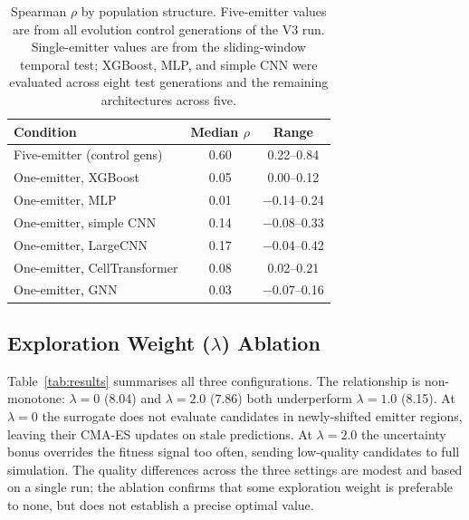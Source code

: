 \documentclass[conference]{IEEEtran}
\begin{document}
\begin{table}[htbp]
  \caption{Spearman $\rho$ by population structure. Five-emitter values
           are from all evolution control generations of the V3 run.
           Single-emitter values are from the sliding-window temporal
           test; XGBoost, MLP, and simple CNN were evaluated across
           eight test generations and the remaining architectures across
           five.}
  \label{tab:rho_comparison}
  \begin{center}
    \begin{tabular}{lcc}
      \toprule
      \textbf{Condition} & \textbf{Median $\rho$} & \textbf{Range} \\
      \midrule
      Five-emitter (control gens) & 0.60 & 0.22--0.84 \\
      One-emitter, XGBoost        & 0.05 & 0.00--0.12 \\
      One-emitter, MLP            & 0.01 & $-$0.14--0.24 \\
      One-emitter, simple CNN     & 0.14 & $-$0.08--0.33 \\
      One-emitter, LargeCNN       & 0.17 & $-$0.04--0.42 \\
      One-emitter, CellTransformer & 0.08 & 0.02--0.21 \\
      One-emitter, GNN            & 0.03 & $-$0.07--0.16 \\
      \bottomrule
    \end{tabular}
  \end{center}
\end{table}

\subsection{Exploration Weight ($\lambda$) Ablation}

Table~\ref{tab:results} summarises all three configurations. The relationship
is non-monotone: $\lambda = 0$ (8.04) and $\lambda = 2.0$ (7.86) both
underperform $\lambda = 1.0$ (8.15). At $\lambda = 0$ the surrogate does not
evaluate candidates in newly-shifted emitter regions, leaving their CMA-ES
updates on stale predictions. At $\lambda = 2.0$ the uncertainty bonus
overrides the fitness signal too often, sending low-quality candidates to full
simulation. The quality differences across the three settings are modest and
based on a single run; the ablation confirms that some exploration weight is
preferable to none, but does not establish a precise optimal value.
\end{document}
